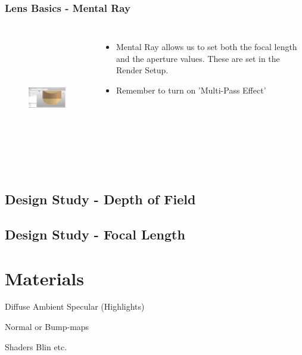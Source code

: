 \begin{frame}
\frametitle{Lens Basics - Mental Ray}
       \begin{columns}
             \centering
						
						\begin{figure}
							\centering
								\includegraphics[height=5cm, width=3.5cm]{img/AddingEdges.JPG}
							\label{fig:AddingEdges}
						\end{figure}
						
						\begin{itemize}
							\item Mental Ray allows us to set both the focal length and the aperture values.  These are set in the Render Setup.  
							\item Remember to turn on 'Multi-Pass Effect'
						\end{itemize}
         \end{columns} 
\end{frame}



\subsection{Design Study - Depth of Field}


\subsection{Design Study - Focal Length}

\section{Materials}

Diffuse
Ambient
Specular (Highlights)

Normal or Bump-maps


Shaders
Blin etc.





